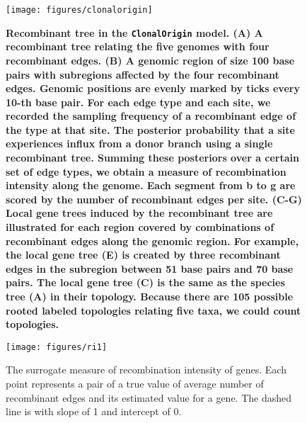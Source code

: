 \documentclass[10pt]{article}
\begin{document}
\begin{figure}[!ht]
\texttt{[image: figures/clonalorigin]}
\caption{
\bf{Recombinant tree in the \texttt{ClonalOrigin} model.}
(A) A recombinant tree relating the five genomes with four recombinant edges.
(B) A genomic region of size 100 base pairs with subregions affected by the
four recombinant edges. Genomic positions are evenly marked by ticks every 10-th
base pair.  For each edge type and each site, we recorded the sampling frequency
of a recombinant edge of the type at that site.  The posterior probability that
a site experiences influx from a donor branch using a single recombinant tree.
Summing these posteriors over a certain set of edge types, we obtain a measure
of recombination intensity along the genome.  Each segment from b to g are
scored by the number of recombinant edges per site.  (C-G) Local gene trees
induced by the recombinant tree are illustrated for each region covered by
combinations of recombinant edges along the genomic region. For example, the
local gene tree (E) is created by three recombinant edges in the subregion
between 51 base pairs and 70 base pairs. The local gene tree (C) is the same as
the species tree (A) in their topology.  Because there are 105 possible rooted
labeled topologies relating five taxa, we could count topologies.}
\label{fig:clonalorigin}
\end{figure}
\clearpage{}%

\begin{figure}
\texttt{[image: figures/ri1]}
\caption{\label{fig:ri1}The surrogate measure of recombination intensity
of genes. Each point represents a pair of a true value of average number of
recombinant edges and its estimated value for a gene. The dashed line is with
slope of 1 and intercept of 0.}
\end{figure}
\clearpage{}%


\end{document}
